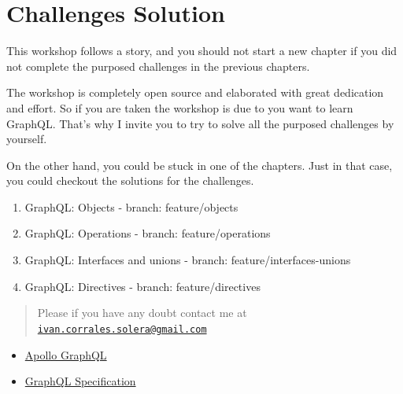 \documentclass[]{book}
\providecommand{\tightlist}{%
  \setlength{\itemsep}{0pt}\setlength{\parskip}{0pt}}
\begin{document}
\chapter{Challenges Solution}\label{challenges-solution}

This workshop follows a story, and you should not start a new chapter if
you did not complete the purposed challenges in the previous chapters.

The workshop is completely open source and elaborated with great
dedication and effort. So if you are taken the workshop is due to you
want to learn GraphQL. That's why I invite you to try to solve all the
purposed challenges by yourself.

On the other hand, you could be stuck in one of the chapters. Just in
that case, you could checkout the solutions for the challenges.

\begin{enumerate}
\def\labelenumi{\arabic{enumi}.}
\setcounter{enumi}{3}
\tightlist
\item
  GraphQL: Objects - branch: feature/objects
\item
  GraphQL: Operations - branch: feature/operations
\item
  GraphQL: Interfaces and unions - branch: feature/interfaces-unions
\item
  GraphQL: Directives - branch: feature/directives
\end{enumerate}

\begin{quote}
Please if you have any doubt contact me at
\href{mailto:ivan.corrales.solera@gmail.com}{\nolinkurl{ivan.corrales.solera@gmail.com}}
\end{quote}

\begin{itemize}
\tightlist
\item
  \href{https://www.apollographql.com/docs/}{Apollo GraphQL}
\item
  \href{https://facebook.github.io/graphql/}{GraphQL Specification}
\end{itemize}
\end{document}
